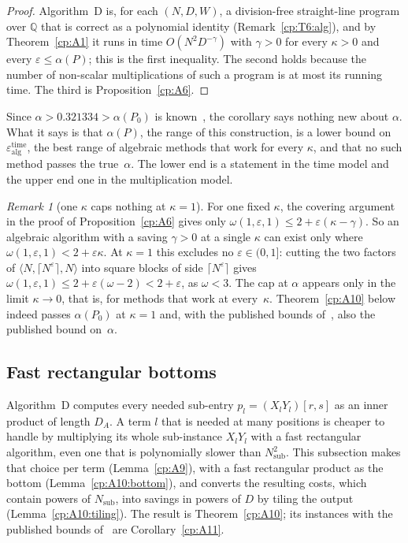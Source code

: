 \documentclass[11pt]{article}
\theoremstyle{definition}
\theoremstyle{remark}
\newtheorem{remark}[theorem]{Remark}
\providecommand{\eps}{\varepsilon}
\providecommand{\Q}{\mathbb{Q}}
\newcommand{\mat}[3]{\langle #1,#2,#3\rangle} %
\newcommand{\AlgD}{Algorithm~D}                             %
\newcommand{\Pzero}{P_0}                      %
\newcommand{\AlphaVXXZ}{0.321334}%
\begin{document}
\begin{proof}
\AlgD{} is, for each $(N,D,W)$, a division-free straight-line program over $\Q$ that is correct as a polynomial identity (Remark~\ref{cp:T6:alg}), and by Theorem~\ref{cp:A1} it runs in time $O(N^2D^{-\gamma})$ with $\gamma>0$ for every $\kappa>0$ and every $\eps\le\alpha(P)$; this is the first inequality. The second holds because the number of non-scalar multiplications of such a program is at most its running time. The third is Proposition~\ref{cp:A6}.
\end{proof}

Since $\alpha>\AlphaVXXZ>\alpha(\Pzero)$ is known~\cite{VXXZ24}, the corollary says nothing new about $\alpha$. What it says is that $\alpha(P)$, the range of this construction, is a lower bound on $\eps^{\mathrm{time}}_{\mathrm{alg}}$, the best range of algebraic methods that work for every $\kappa$, and that no such method passes the true~$\alpha$. The lower end is a statement in the time model and the upper end one in the multiplication model.

\begin{remark}[one $\kappa$ caps nothing at $\kappa=1$]\label{cp:A8}
For one fixed $\kappa$, the covering argument in the proof of Proposition~\ref{cp:A6} gives only $\omega(1,\eps,1)\le2+\eps(\kappa-\gamma)$. So an algebraic algorithm with a saving $\gamma>0$ at a single $\kappa$ can exist only where $\omega(1,\eps,1)<2+\eps\kappa$. At $\kappa=1$ this excludes no $\eps\in(0,1]$: cutting the two factors of $\mat N{\lceil N^\eps\rceil}N$ into square blocks of side $\lceil N^\eps\rceil$ gives $\omega(1,\eps,1)\le2+\eps(\omega-2)<2+\eps$, as $\omega<3$. The cap at $\alpha$ appears only in the limit $\kappa\to0$, that is, for methods that work at every~$\kappa$. Theorem~\ref{cp:A10} below indeed passes $\alpha(\Pzero)$ at $\kappa=1$ and, with the published bounds of~\cite{VXXZ24}, also the published bound on~$\alpha$.
\end{remark}

\subsection{Fast rectangular bottoms}\label{cp:sec:range-fast}

\AlgD{} computes every needed sub-entry $p_l=(X_lY_l)[r,s]$ as an inner product of length $D_A$. A term $l$ that is needed at many positions is cheaper to handle by multiplying its whole sub-instance $X_lY_l$ with a fast rectangular algorithm, even one that is polynomially slower than $N_{\mathrm{sub}}^2$. This subsection makes that choice per term (Lemma~\ref{cp:A9}), with a fast rectangular product as the bottom (Lemma~\ref{cp:A10:bottom}), and converts the resulting costs, which contain powers of $N_{\mathrm{sub}}$, into savings in powers of $D$ by tiling the output (Lemma~\ref{cp:A10:tiling}). The result is Theorem~\ref{cp:A10}; its instances with the published bounds of~\cite{VXXZ24} are Corollary~\ref{cp:A11}.
\end{document}
